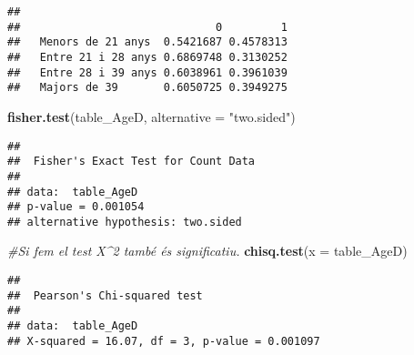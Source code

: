 \documentclass[]{article}
\newenvironment{Shaded}{\begin{snugshade}}{\end{snugshade}}
\newcommand{\CommentTok}[1]{\textcolor[rgb]{0.56,0.35,0.01}{\textit{#1}}}
\newcommand{\DataTypeTok}[1]{\textcolor[rgb]{0.13,0.29,0.53}{#1}}
\newcommand{\DecValTok}[1]{\textcolor[rgb]{0.00,0.00,0.81}{#1}}
\newcommand{\KeywordTok}[1]{\textcolor[rgb]{0.13,0.29,0.53}{\textbf{#1}}}
\newcommand{\NormalTok}[1]{#1}
\newcommand{\OperatorTok}[1]{\textcolor[rgb]{0.81,0.36,0.00}{\textbf{#1}}}
\newcommand{\StringTok}[1]{\textcolor[rgb]{0.31,0.60,0.02}{#1}}
\begin{document}
\begin{Shaded}
\end{Shaded}

\begin{verbatim}
##                     
##                              0         1
##   Menors de 21 anys  0.5421687 0.4578313
##   Entre 21 i 28 anys 0.6869748 0.3130252
##   Entre 28 i 39 anys 0.6038961 0.3961039
##   Majors de 39       0.6050725 0.3949275
\end{verbatim}

\begin{Shaded}
\begin{Highlighting}[]
\KeywordTok{fisher.test}\NormalTok{(table_AgeD, }\DataTypeTok{alternative =} \StringTok{"two.sided"}\NormalTok{)}
\end{Highlighting}
\end{Shaded}

\begin{verbatim}
## 
##  Fisher's Exact Test for Count Data
## 
## data:  table_AgeD
## p-value = 0.001054
## alternative hypothesis: two.sided
\end{verbatim}

\begin{Shaded}
\begin{Highlighting}[]
\CommentTok{#Si fem el test X^2 també és significatiu.}
\KeywordTok{chisq.test}\NormalTok{(}\DataTypeTok{x =}\NormalTok{ table_AgeD)}
\end{Highlighting}
\end{Shaded}

\begin{verbatim}
## 
##  Pearson's Chi-squared test
## 
## data:  table_AgeD
## X-squared = 16.07, df = 3, p-value = 0.001097
\end{verbatim}

\begin{Shaded}
\end{Shaded}
\end{document}
